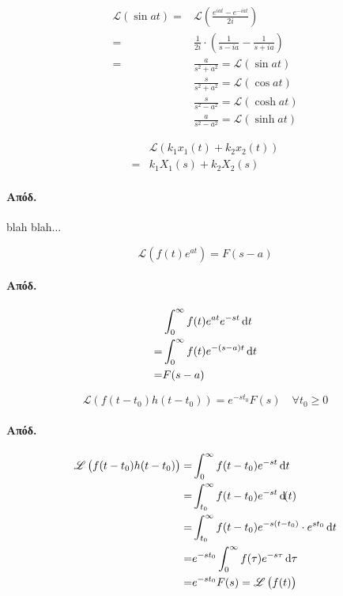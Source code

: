 \documentclass[11pt,a4paper,titlepage,draft]{article}
\begin{document}
\paragraph{}
\begin{align*}
\mathscr L(\sin at)  =& \mathscr{L}
\left(
\frac{e^{iat}-e^{-iat}}{2i}
\right)
\\=&
\frac{1}{2i}\cdot\left(
\frac{1}{s-ia}-\frac{1}{s+ia}
\right)
\\=&\frac{a}{s^2+a^2} = \mathscr{L}(\sin at)
\\&\frac{s}{s^2+a^2}=\mathscr{L}(\cos at)
\\&\frac{s}{s^2-a^2}=\mathscr{L}(\cosh at)
\\&\frac{a}{s^2-a^2}=\mathscr{L}(\sinh at)
\end{align*}

\begin{theorem*}{}
\begin{align*}
&\mathscr{L}\left(
k_1x_1(t)+k_2x_2(t)
\right)\\
=&k_1X_1(s)+k_2X_2(s)
\end{align*}
\end{theorem*}
\paragraph{Απόδ.}
\textlatin{blah blah...}

\begin{theorem*}{}
\[
\mathscr{L}\left(
f(t)e^{at}
\right) = F(s-a)
\]
\end{theorem*}
\paragraph{Απόδ.}
\begin{align*}
&\int_0^\infty f(t)e^{at}e^{-st}\dif t
\\=&
\int_0^\infty f(t)e^{-(s-a)t} \dif t
\\=&
F(s-a)
\end{align*}

\begin{theorem*}{}
\[
\mathscr{L}\left(
f(t-t_0)h(t-t_0)
\right)=e^{-st_0}F(s) \quad \forall t_0 \geq 0
\]
\end{theorem*}
\paragraph{Απόδ.}
\begin{align*}
\mathscr{L}\left(
f(t-t_0)h(t-t_0)\right) =&
\int_0^\infty f(t-t_0)e^{-st} \dif t
\\=&
\int_{t_0}^\infty f(t-t_0)e^{-st} \dif(t)
\\=&
\int_{t_0}^\infty f(t-t_0)e^{-s(t-t_0)}\cdot e^{st_0}\dif t
\\=&
e^{-st_0} \int_0^\infty f(\tau) e^{-s\tau} \dif \tau 
\\=&
e^{-st_0} F(s) = \mathscr{L}\left(f(t)\right)
\end{align*}
\end{document}
